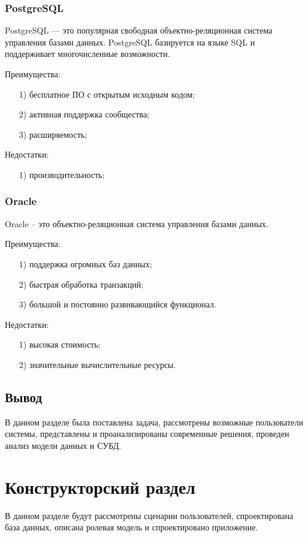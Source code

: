 \subsubsection{PostgreSQL}
PostgreSQL — это популярная свободная объектно-реляционная система управления базами данных. PostgreSQL базируется на языке SQL и поддерживает многочисленные возможности.

Преимущества:
\begin{itemize}
	\item[1)] бесплатное ПО с открытым исходным кодом;
	\item[2)] активная поддержка сообщества;
	\item[3)] расширяемость;   
\end{itemize}
Недостатки:
\begin{itemize}
	\item[1)] производительность;

\end{itemize}
\subsubsection{Oracle}
Oracle – это объектно-реляционная система управления базами данных.

Преимущества:
\begin{itemize}
	\item[1)] поддержка огромных баз данных;
	\item[2)] быстрая обработка транзакций;
	\item[3)] большой и постоянно развивающийся функционал.   
\end{itemize}
Недостатки:
\begin{itemize}
	\item[1)] высокая стоимость; 
	\item[2)] значительные вычислительные ресурсы. 
\end{itemize}

\subsection{Вывод}
В данном разделе была поставлена задача, рассмотрены возможные пользователи системы, представлены и проанализированы современные решения, проведен анализ модели данных и СУБД.


\clearpage
\section{Конструкторский раздел}
В данном разделе будут рассмотрены сценарии пользователей, спроектирована база данных, описана ролевая модель и спроектировано приложение.
